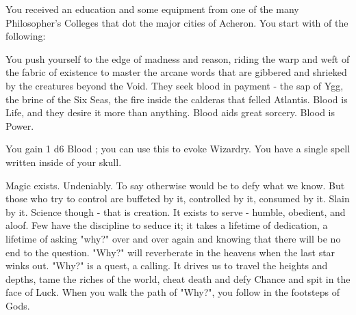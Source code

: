 {    

    You received an education and some equipment from one of the many Philosopher's Colleges that dot the major cities of Acheron.  You start with  of the following:




  You push yourself to the edge of madness and reason, riding the warp and weft of the fabric of existence to master the arcane words that are gibbered and shrieked by the creatures beyond the Void.  They seek blood in payment - the sap of  Ygg, the brine of the Six Seas, the fire inside the calderas that felled Atlantis.  Blood is Life, and they desire it more than anything.  Blood aids great sorcery. Blood is Power.  

  You gain 1 d6 Blood \POOL; you can use this \POOL to evoke Wizardry.  You have a single spell written inside of your skull. \footnotemark 


  Magic exists.  Undeniably.  To say otherwise would be to defy what we know.  But those who try to control  are buffeted by it, controlled by it, consumed by it.  Slain by it.  Science though - that is  creation.  It exists to serve - humble, obedient, and aloof.  Few have the discipline to seduce it; it takes a lifetime of dedication, a lifetime of asking "why?" over and over again and knowing that there will be no end to the question.  "Why?" will reverberate in the heavens when the last star winks out.  "Why?" is a quest, a calling.  It drives us to travel the heights and depths, tame the riches of the world, cheat death and defy Chance and spit in the face of Luck.  When you walk the path of "Why?", you follow in the footsteps of Gods.

}
